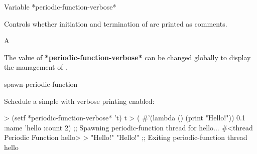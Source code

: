 \begin{functiondoc}{Variable}%
  {*periodic-function-verbose*}{}%

\fnsyntax

\fnpurpose Controls whether initiation and termination of
  are printed as comments.

\fnpackage {}

\fnmodule {}

\fnvaluetype A 

\fninitialvalue \nil

\fndescription The value of \textbf{*periodic-function-verbose*} can be
changed globally to display the management of .

\begin{alsos}{spawn-periodic-function}
\end{alsos}

%
\fnexample 
Schedule a simple  with verbose printing enabled:
%
\W\supp
\begin{example}
> (setf *periodic-function-verbose* 't)
t
> ( #'(lambda () (print "Hello!")) 0.1 
    :name 'hello
    :count 2)
;; Spawning periodic-function thread for hello...
#<thread Periodic Function hello>
>
"Hello!" 
"Hello!" 
;; Exiting periodic-function thread hello
\end{example}

\end{functiondoc}


